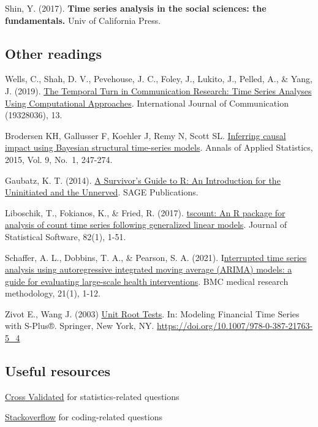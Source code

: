 \documentclass[
]{article}
\begin{document}
Shin, Y. (2017). \textbf{Time series analysis in the social sciences: the fundamentals.} Univ of California Press.

\subsection{Other readings}\label{other-readings}

Wells, C., Shah, D. V., Pevehouse, J. C., Foley, J., Lukito, J., Pelled, A., \& Yang, J. (2019). \href{https://ijoc.org/index.php/ijoc/article/view/10635}{The Temporal Turn in Communication Research: Time Series Analyses Using Computational Approaches}. International Journal of Communication (19328036), 13.

Brodersen KH, Gallusser F, Koehler J, Remy N, Scott SL. \href{http://research.google.com/pubs/pub41854.html}{Inferring causal impact using Bayesian structural time-series models}. Annals of Applied Statistics, 2015, Vol. 9, No.~1, 247-274.

Gaubatz, K. T. (2014). \href{https://methods.sagepub.com/Book/a-survivors-guide-to-r}{A Survivor's Guide to R: An Introduction for the Uninitiated and the Unnerved}. SAGE Publications.

Liboschik, T., Fokianos, K., \& Fried, R. (2017). \href{https://cran.r-project.org/web/packages/tscount/vignettes/tsglm.pdf}{tscount: An R package for analysis of count time series following generalized linear models}. Journal of Statistical Software, 82(1), 1-51.

Schaffer, A. L., Dobbins, T. A., \& Pearson, S. A. (2021). I\href{https://bmcmedresmethodol.biomedcentral.com/articles/10.1186/s12874-021-01235-8}{nterrupted time series analysis using autoregressive integrated moving average (ARIMA) models: a guide for evaluating large-scale health interventions}. BMC medical research methodology, 21(1), 1-12.

Zivot E., Wang J. (2003) \href{https://faculty.washington.edu/ezivot/econ584/notes/unitroot.pdf}{Unit Root Tests}. In: Modeling Financial Time Series with S-Plus®. Springer, New York, NY. \url{https://doi.org/10.1007/978-0-387-21763-5_4}

\subsection{Useful resources}\label{useful-resources}

\href{https://stats.stackexchange.com}{Cross Validated} for statistics-related questions

\href{https://stackoverflow.com/questions}{Stackoverflow} for coding-related questions
\end{document}
